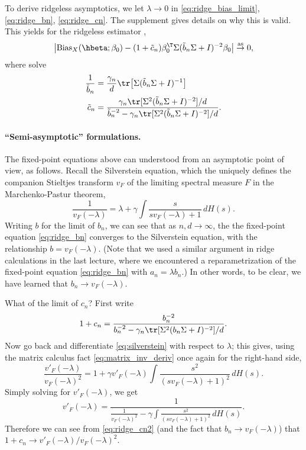 \documentclass{article}
\begin{document}
To derive ridgeless asymptotics, we let $\lambda \to 0$ in
\eqref{eq:ridge_bias_limit}, \eqref{eq:ridge_bn}, \eqref{eq:ridge_cn}. The
supplement gives details on why this is valid. This yields for the ridgeless
estimator , 
\begin{equation}
\label{eq:ridgeless_bias_limit}
\big| \Bias_X(\hbeta; \beta_0) - (1+\tilde{c}_n) \beta_0^\T \Sigma (\tilde{b}_n
\Sigma + I)^{-2} \beta_0 \big| \asto 0,  
\end{equation}
where  solve
\begin{align}
\label{eq:ridgeless_bn}
\frac{1}{\tilde{b}_n} &= \frac{\gamma_n}{d} \tr \big[ \Sigma (\tilde{b}_n \Sigma
  + I)^{-1} \big]\\  
\label{eq:ridgeless_cn}
\tilde{c}_n &= \frac{\gamma_n \tr [ \Sigma^2 (\tilde{b}_n \Sigma + I)^{-2} ] /
  d}{\tilde{b}_n^{-2} - \gamma_n \tr [ \Sigma^2 (\tilde{b}_n \Sigma + I)^{-2} ]
  / d}. 
\end{align}

\paragraph{``Semi-asymptotic'' formulations.} 

The fixed-point equations above can understood from an asymptotic point of view, 
as follows. Recall the Silverstein equation, which the uniquely defines the
companion Stieltjes transform $v_F$ of the limiting spectral measure $F$ in the
Marchenko-Pastur theorem,  
\begin{equation}
\label{eq:silverstein}
\frac{1}{v_F(-\lambda)} = \lambda + \gamma \int \frac{s}{s v_F(-\lambda) + 1} \,
dH(s).  
\end{equation}
Writing $b$ for the limit of $b_n$, we can see that as $n,d \to \infty$, the the
fixed-point equation \eqref{eq:ridge_bn} converges to the Silverstein equation,
with the relationship $b = v_F(-\lambda)$. (Note that we used a similar argument
in ridge calculations in the last lecture, where we encountered a
reparametrization of the fixed-point equation \eqref{eq:ridge_bn} with $a_n =
\lambda b_n$.) In other words, to be clear, we have learned that $b_n \to
v_F(-\lambda)$.

What of the limit of $c_n$? First write
\begin{equation}
\label{eq:ridge_cn2}
1 + c_n = \frac{b_n^{-2}}{b_n^{-2} - \gamma_n \tr [ \Sigma^2 (b_n \Sigma +
  I)^{-2} ] / d}. 
\end{equation}
Now go back and differentiate \eqref{eq:silverstein} with respect to $\lambda$; 
this gives, using the matrix calculus fact \eqref{eq:matrix_inv_deriv} once
again for the right-hand side,
\[
\frac{v'_F(-\lambda)}{v_F(-\lambda)^2} = 1 + \gamma v'_F(-\lambda) \int
\frac{s^2}{(s v_F(-\lambda) + 1)^2} \, dH(s).
\]
Simply solving for $v'_F(-\lambda)$, we get 
\[
v'_F(-\lambda) = \frac{1}{\frac{1}{v_F(-\lambda)^2} - \gamma \int \frac{s^2}{(s 
    v_F(-\lambda) + 1)^2} \, dH(s)}. 
\]
Therefore we can see from \eqref{eq:ridge_cn2} (and the fact that $b_n \to
v_F(-\lambda)$) that $1+c_n \to v'_F(-\lambda) / v_F(-\lambda)^2$. 
\end{document}

